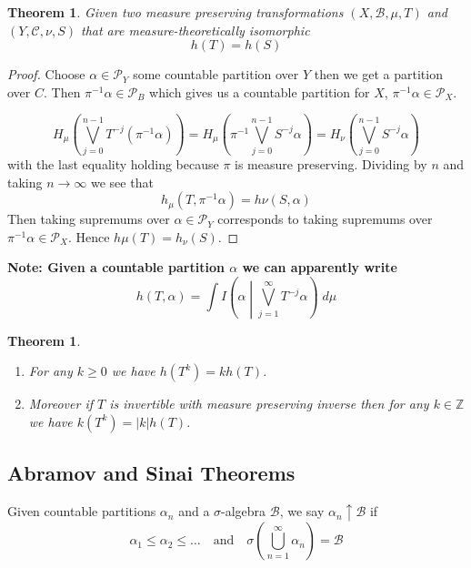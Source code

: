 \documentclass[11pt]{article}
\newcommand{\abs}[1]{\left|#1\right|}
\newcommand{\relmiddle}[1]{\mathrel{}\middle#1\mathrel{}}
\newcommand{\rmv}{\relmiddle|}
\newcommand{\Z}{\mathbb{Z}}
\newcommand{\gvn}[2]{\ensuremath{\left(#1\rmv#2\right)}}
\newcommand{\infog}[2]{\ensuremath{I\gvn{#1}{#2}}}
\newcommand{\dm}{\;d\mu}
\newenvironment{defin}
	{\begin{mdframed}[backgroundcolor=white, roundcorner=5pt, linewidth=1pt]}
	{\end{mdframed}}
\newenvironment{note}
	{\begin{mdframed}[backgroundcolor=white, linecolor=red, roundcorner=5pt, linewidth=1pt]\bfseries{Note:}\normalfont}
	{\end{mdframed}}
\newtheorem{theorem}[prop]{Theorem}
\begin{document}
\begin{theorem}
Given two measure preserving transformations $(X, \mathcal{B}, \mu, T)$ and $(Y, \mathcal{C}, \nu, S)$ that are measure-theoretically isomorphic
\[
	h(T) = h(S)
\]
\end{theorem}

\begin{proof}
Choose $\alpha\in\mathcal{P}_Y$ some countable partition over $Y$ then we get a partition over $C$.
Then $\pi^{-1}\alpha\in\mathcal{P}_B$ which gives us a countable partition for $X$, $\pi^{-1}\alpha\in\mathcal{P}_X$.

\[
	H_\mu\left( \bigvee_{j=0}^{n-1} T^{-j}(\pi^{-1}\alpha)\right) = H_\mu\left( \pi^{-1}\bigvee_{j=0}^{n-1} S^{-j}\alpha\right)
	= H_\nu\left(\bigvee_{j=0}^{n-1} S^{-j}\alpha \right)
\]
with the last equality holding because $\pi$ is measure preserving.
Dividing by $n$ and taking $n\to\infty$ we see that
\[
	h_\mu(T, \pi^{-1}\alpha) = h\nu(S, \alpha)
\]
Then taking supremums over $\alpha\in\mathcal{P}_Y$ corresponds to taking supremums over $\pi^{-1}\alpha \in \mathcal{P}_X$.
Hence $h\mu(T) = h_\nu(S)$.
\end{proof}

\begin{note}
Given a countable partition $\alpha$ we can apparently write
\[
	h(T, \alpha) = \int \infog{\alpha}{\bigvee_{j=1}^\infty T^{-j}\alpha}\dm
\]
\end{note}

\begin{theorem}
\begin{enumerate}[label=(\roman*)]
	\item For any $k\geq 0$ we have $h(T^k) = kh(T)$.
	\item Moreover if $T$ is invertible with measure preserving inverse then for any $k\in \Z$ we have $k(T^k)=\abs{k}h(T)$.
\end{enumerate}
\end{theorem}

\subsection{Abramov and Sinai Theorems}

\begin{defin}
	Given countable partitions $\alpha_n$ and a $\sigma$-algebra $\mathcal{B}$, we say $\alpha_n\uparrow\mathcal{B}$ if
	\[
		\alpha_1 \leq \alpha_2 \leq \dots \quad \text{and} \quad \sigma\left( \bigcup_{n=1}^\infty \alpha_n\right)=\mathcal{B}
	\]
\end{defin}
\end{document}
